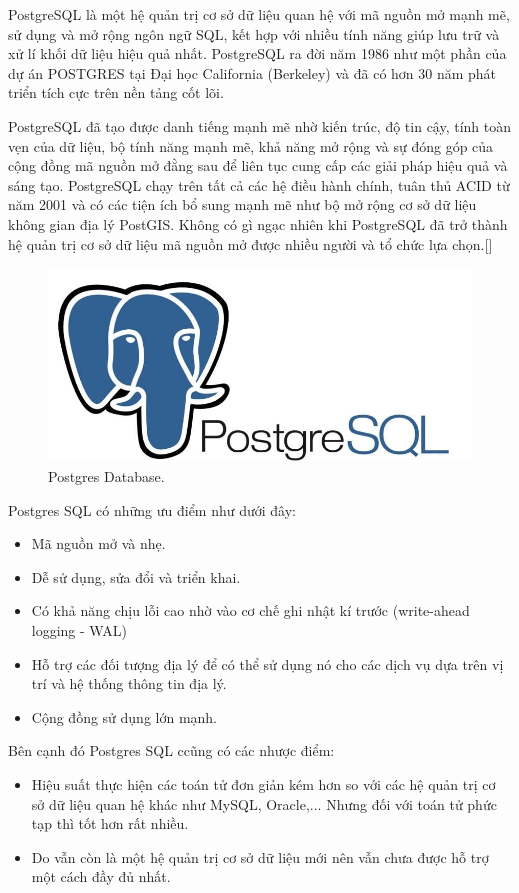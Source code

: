 PostgreSQL là một hệ quản trị cơ sở dữ liệu quan hệ với mã nguồn mở mạnh mẽ, sử dụng và mở rộng ngôn ngữ SQL, kết hợp với nhiều tính năng giúp lưu trữ và xử lí khối dữ liệu hiệu quả nhất. PostgreSQL ra đời năm 1986 như một phần của dự án POSTGRES tại Đại học California (Berkeley) và đã có hơn 30 năm phát triển tích cực trên nền tảng cốt lõi.\par

PostgreSQL đã tạo được danh tiếng mạnh mẽ nhờ kiến trúc, độ tin cậy, tính toàn vẹn của dữ liệu, bộ tính năng mạnh mẽ, khả năng mở rộng và sự đóng góp của cộng đồng mã nguồn mở đằng sau để liên tục cung cấp các giải pháp hiệu quả và sáng tạo. PostgreSQL chạy trên tất cả các hệ điều hành chính, tuân thủ ACID từ năm 2001 và có các tiện ích bổ sung mạnh mẽ như bộ mở rộng cơ sở dữ liệu không gian địa lý PostGIS. Không có gì ngạc nhiên khi PostgreSQL đã trở thành hệ quản trị cơ sở dữ liệu mã nguồn mở được nhiều người và tổ chức lựa chọn.[\cite{postgresql}] \par

 \begin{figure}[H]
    \begin{center}
        \includegraphics[width=12cm]{Image/Technical/postgresql.png}
        \caption{Postgres Database.}
        \label{postgres}
    \end{center}
\end{figure}

\par
Postgres SQL có những ưu điểm như dưới đây:
\begin{itemize}
    \item Mã nguồn mở và nhẹ.
    \item Dễ sử dụng, sửa đổi và triển khai.
    \item Có khả năng chịu lỗi cao nhờ vào cơ chế ghi nhật kí trước (write-ahead logging - WAL)
    \item Hỗ trợ các đối tượng địa lý để có thể sử dụng nó cho các dịch vụ dựa trên vị trí và hệ thống thông tin địa lý.
    \item Cộng đồng sử dụng lớn mạnh.
\end{itemize}
Bên cạnh đó Postgres SQL ccũng có các nhược điểm:
\begin{itemize}
    \item Hiệu suất thực hiện các toán tử đơn giản kém hơn so với các hệ quản trị cơ sở dữ liệu quan hệ khác như MySQL, Oracle,... Nhưng đối với toán tử phức tạp thì tốt hơn rất nhiều.
    \item Do vẫn còn là một hệ quản trị cơ sở dữ liệu mới nên vẫn chưa được hỗ trợ một cách đầy đủ nhất.
\end{itemize}